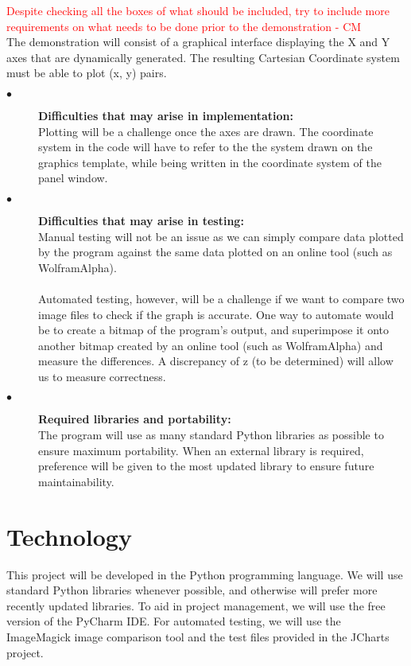 \documentclass{article}
\begin{document}
\textcolor{red}{Despite checking all the boxes of what should be included, try to include more requirements on what needs to be done prior to the demonstration - CM} \\
The demonstration will consist of a graphical interface displaying the X and Y axes that are dynamically generated. The resulting Cartesian Coordinate system must be able to plot (x, y) pairs. 
\begin{description}
  \item[$\bullet$]  \textbf{Difficulties that may arise in implementation:} \\
  	Plotting will be a challenge once the axes are drawn. The coordinate system in the code will have to refer to the the system drawn on the graphics template, while being written in the coordinate system of the panel window. 

\item[$\bullet$]  \textbf{Difficulties that may arise in testing:} \\
Manual testing will not be an issue as we can simply compare data plotted by the program against the same data plotted on an online tool (such as WolframAlpha).\\ \\
Automated testing, however, will be a challenge if we want to compare two image files to check if the graph is accurate. One way to automate would be to create a bitmap of the program's output, and superimpose it onto another bitmap created by an online tool (such as WolframAlpha) and measure the differences. A discrepancy of z (to be determined) will allow us to measure correctness. 

\item[$\bullet$]  \textbf{Required libraries and portability:} \\
The program will use as many standard Python libraries as possible to ensure maximum portability. When an external library is required, preference will be given to the most updated library to ensure future maintainability. 

\end{description}

\section{Technology} %
This project will be developed in the Python programming language. We will use standard Python libraries whenever possible, and otherwise will prefer more recently updated libraries. To aid in project management, we will use the free version of the PyCharm IDE.  For automated testing, we will use the ImageMagick image comparison tool and the test files provided in the JCharts project.
\end{document}
